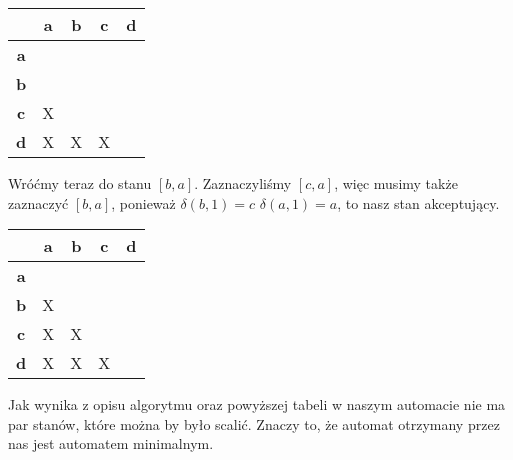 \documentclass[10pt,a4paper, polish]{report}
\begin{document}
\begin{table}[H]
    \centering
    \begin{tabular}{|c|c|c|c|c|}
    \hline
    		   & \textbf{a} & \textbf{b} & \textbf{c} & \textbf{d}\\\hline
    \textbf{a}\\\hline
    \textbf{b} & \\\hline
    \textbf{c} & X & \\\hline
    \textbf{d} & X & X & X \\\hline
    \end{tabular}
    \label{tab:mytable}
\end{table}
Wróćmy teraz do stanu $[b,a]$. Zaznaczyliśmy $[c,a]$, więc musimy także zaznaczyć $[b,a]$, ponieważ $\delta(b,1) = c$ $\delta(a,1) = a$, to nasz stan akceptujący.
\begin{table}[H]
    \centering
    \begin{tabular}{|c|c|c|c|c|}
    \hline
    		   & \textbf{a} & \textbf{b} & \textbf{c} & \textbf{d}\\\hline
    \textbf{a}\\\hline
    \textbf{b} & X\\\hline
    \textbf{c} & X & X\\\hline
    \textbf{d} & X & X & X \\\hline
    \end{tabular}
    \label{tab:mytable}
\end{table}
Jak wynika z opisu algorytmu oraz powyższej tabeli w naszym automacie nie ma par stanów, które można by było scalić. Znaczy to, że automat otrzymany przez nas jest automatem minimalnym.\\
\end{document}
